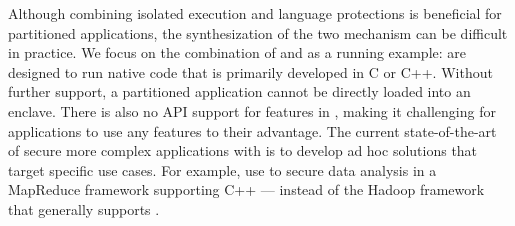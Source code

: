 {%

Although combining isolated execution and language protections
is beneficial for partitioned applications,
the synthesization of the two mechanism can be difficult in practice.
We focus on the combination of \sgx{} and \java{} as a running example:
\sgx{} are designed to run native code that is primarily developed in C or C++.
Without further support, a partitioned \java{} application
cannot be directly loaded into an enclave.
There is also no API support for \sgx{} features in \java{},
making it challenging for \java{} applications to use any \sgx{} features to their advantage.
The current state-of-the-art of secure more complex applications with \sgx{} is to develop ad hoc solutions that target specific use cases.
For example, \cite{vc3} use \sgx{} to secure data analysis in a MapReduce framework supporting C++
--- instead of the Hadoop framework that generally supports \java{}.



}
